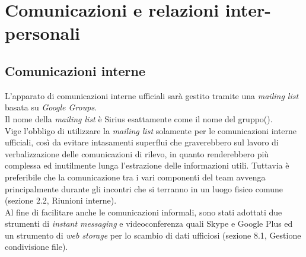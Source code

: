 \section{Comunicazioni e relazioni inter-personali}
\subsection{Comunicazioni interne}
L'apparato di comunicazioni interne ufficiali sarà gestito tramite una \textit{mailing list} basata su \textit{Google Groups}.\\
Il nome della \textit{mailing list} è Sirius esattamente come il nome del gruppo(\gruppo).\\ Vige l'obbligo di utilizzare la \textit{mailing list} solamente per le comunicazioni interne ufficiali, così da evitare intasamenti superflui che graverebbero sul lavoro di verbalizzazione delle comunicazioni di rilevo, in quanto renderebbero più complessa ed inutilmente lunga l'estrazione delle informazioni utili. Tuttavia è preferibile che la comunicazione tra i vari componenti del team avvenga principalmente durante gli incontri che si terranno in un luogo fisico comune (sezione 2.2, Riunioni interne).\\
Al fine di facilitare anche le comunicazioni informali, sono stati adottati due strumenti di \textit{instant messaging} e videoconferenza quali Skype e Google Plus ed un strumento di \textit{web storage} per lo scambio di dati ufficiosi (sezione 8.1, Gestione condivisione file).


